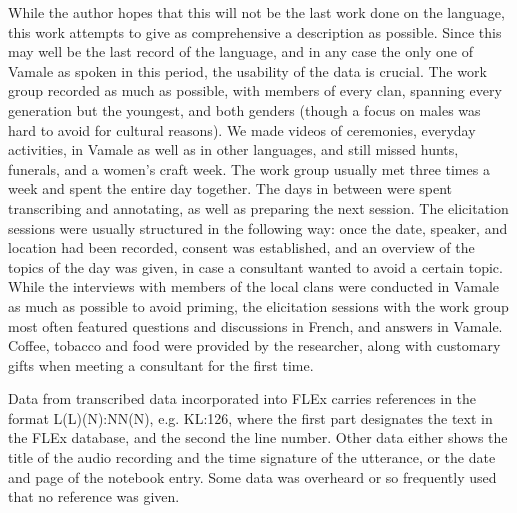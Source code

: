 While the author hopes that this will not be the last work done on the language, this work attempts to give as comprehensive a description as possible. Since this may well be the last record of the language, and in any case the only one of Vamale as spoken in this period, the usability of the data is crucial. The work group recorded as much as possible, with members of every clan, spanning every generation but the youngest, and both genders (though a focus on males was hard to avoid for cultural reasons). We made videos of ceremonies, everyday activities, in Vamale as well as in other languages, and still missed hunts, funerals, and a women's craft week. The work group usually met three times a week and spent the entire day together. The days in between were spent transcribing and annotating, as well as preparing the next session. The elicitation sessions were usually structured in the following way: once the date, speaker, and location had been recorded, consent was established, and an overview of the topics of the day was given, in case a consultant wanted to avoid a certain topic. While the interviews with members of the local clans were conducted in Vamale as much as possible to avoid priming, the elicitation sessions with the work group most often featured questions and discussions in French, and answers in Vamale. Coffee, tobacco and food were provided by the researcher, along with customary gifts when meeting a consultant for the first time.

Data from transcribed data incorporated into FLEx carries references in the format L(L)(N):NN(N), e.g. KL:126, where the first part designates the text in the FLEx database, and the second the line number. Other data either shows the title of the audio recording and the time signature of the utterance, or the date and page of the notebook entry. Some data was overheard or so frequently used that no reference was given. 

